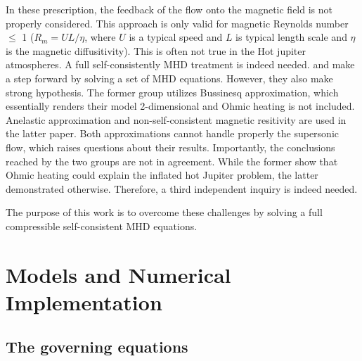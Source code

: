 \documentclass[11pt]{article}
\begin{document}
In these prescription, the feedback of the flow onto the magnetic field is not properly considered. This approach is only valid for magnetic Reynolds number $\leq$ 1 ($R_m = UL/\eta$, where  $U$ is a typical speed and $L$ is typical length scale and $\eta$ is the magnetic diffusitivity). This is often not true in the Hot jupiter atmospheres. A full self-consistently MHD treatment is indeed needed. \citet*{batygin2013} and \citet*{rogers2014} make a step forward by solving a set of MHD equations. However, they also make strong hypothesis. The former group utilizes Bussinesq approximation, which essentially renders their model 2-dimensional and Ohmic heating is not included. Anelastic approximation and non-self-consistent magnetic resitivity are used in the latter paper. Both approximations cannot handle properly the supersonic flow, which raises questions about their results. Importantly, the conclusions reached by the two groups are not in agreement. While the former show that Ohmic heating could explain the inflated hot Jupiter problem, the latter demonstrated otherwise. Therefore, a third independent inquiry is indeed needed. 

The purpose of this work is to overcome these challenges by solving a full compressible self-consistent MHD equations. 


\section{Models and Numerical Implementation }
\subsection{The governing equations}
\end{document}
